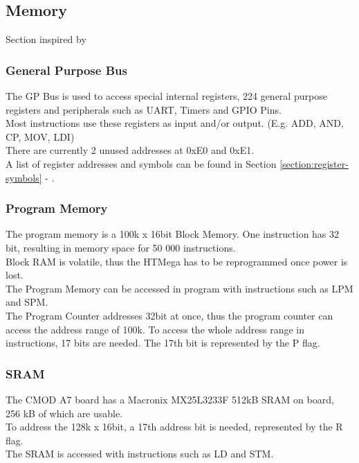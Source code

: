 \subsection{Memory}
\begin{footnotesize}Section inspired by \cite{atmega328p-memory} \end{footnotesize}
\subsubsection{General Purpose Bus}
The GP Bus is used to access special internal registers, 224 general purpose registers and peripherals such as UART, Timers and GPIO Pins.\\
Most instructions use these registers as input and/or output. (E.g. ADD, AND, CP, MOV, LDI)\\
There are currently 2 unused addresses at 0xE0 and 0xE1.\\
A list of register addresses and symbols can be found in Section \ref{section:register-symbols} - .

\subsubsection{Program Memory}
The program memory is a 100k x 16bit Block Memory. One instruction has 32 bit, resulting in memory space for 50 000 instructions.\\
Block RAM is volatile, thus the HTMega has to be reprogrammed once power is lost.\\

The Program Memory can be accessed in program with instructions such as LPM and SPM.\\
The Program Counter addresses 32bit at once, thus the program counter can access the address range of 100k.
To access the whole address range in instructions, 17 bits are needed. The 17th bit is represented by the P flag.

\subsubsection{SRAM}
The CMOD A7 board has a Macronix MX25L3233F 512kB SRAM on board,\\ 256 kB of which are usable.\\
To address the 128k x 16bit, a 17th address bit is needed, represented by the R flag.\\

The SRAM is accessed with instructions such as LD and STM.\\

